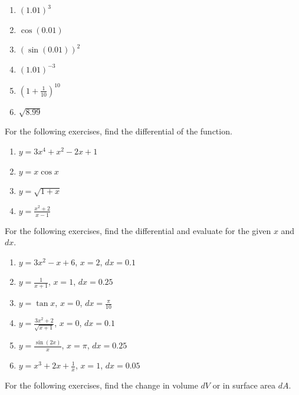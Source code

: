 \documentclass{exercises}
\begin{document}
\begin{enumerate}[resume]
\item \techrequired ${(1.01)}^{3}$
\item \techrequired $\cos(0.01)$
\item \techrequired ${(\sin(0.01))}^{2}$
\item \techrequired ${(1.01)}^{-3}$
\item \techrequired ${(1+\frac{1}{10})}^{10}$
\item \techrequired $\sqrt{8.99}$
\end{enumerate}

For the following exercises, find the differential of the function.

\begin{enumerate}[resume]
\item $y=3x^{4}+x^{2}-2x+1$
\item $y=x\cos x$
\item $y=\sqrt{1+x}$
\item $y=\frac{x^{2}+2}{x-1}$
\end{enumerate}

For the following exercises, find the differential and evaluate for the given $x$ and $dx$.

\begin{enumerate}[resume]
\item $y=3x^{2}-x+6$, $x=2$, $dx=0.1$
\item $y=\frac{1}{x+1}$, $x=1$, $dx=0.25$
\item $y=\tan x$, $x=0$, $dx=\frac{\pi}{10}$
\item $y=\frac{3x^{2}+2}{\sqrt{x+1}}$, $x=0$, $dx=0.1$
\item $y=\frac{\sin(2x)}{x}$, $x=\pi$, $dx=0.25$
\item $y=x^{3}+2x+\frac{1}{x}$, $x=1$, $dx=0.05$
\end{enumerate}

For the following exercises, find the change in volume $dV$ or in surface area $dA$.
\end{document}

